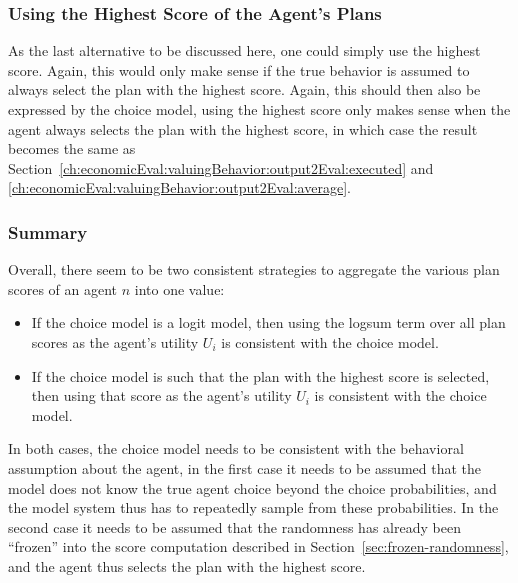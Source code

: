 

\subsubsection{Using the Highest Score of the Agent's Plans}
As the last alternative to be discussed here, one could simply use the highest score.  Again, this would only make sense if the true behavior is assumed to always select the plan with the highest score.  Again, this should then also be expressed by the choice model, \ie using the highest score only makes sense when the agent always selects the plan with the highest score, in which case the result becomes the same as Section~\ref{ch:economicEval:valuingBehavior:output2Eval:executed} and \ref{ch:economicEval:valuingBehavior:output2Eval:average}.

\subsubsection{Summary}
\label{ch:economicEval:valuingBehavior:output2Eval:summary}

Overall, there seem to be two consistent strategies to aggregate the various plan scores of an agent $n$ into one value:
\begin{itemize}\styleItemize

\item If the choice model is a logit model, then using the logsum term over all plan scores as the agent's utility $U_i$ is consistent with the choice model.

\item If the choice model is such that the plan with the highest score is selected, then using that score as the agent's utility $U_i$ is consistent with the choice model.

\end{itemize}
In both cases, the choice model needs to be consistent with the behavioral assumption about the agent, \ie in the first case it needs to be assumed that the model does not know the true agent choice beyond the choice probabilities, and the model system thus has to repeatedly sample from these probabilities.  In the second case it needs to be assumed that the randomness has already been ``frozen'' into the score computation described in Section~\ref{sec:frozen-randomness}, and the agent thus selects the plan with the highest score.

